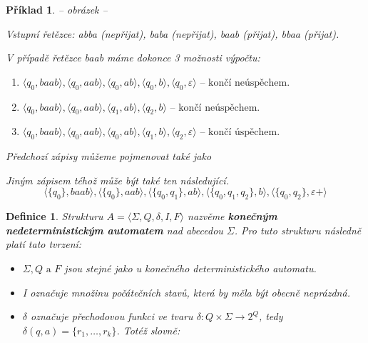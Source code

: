 \documentclass[10pt, a4paper, titlepage]{article}
\theoremstyle{note}
\newtheorem{definice}{\textbf{Definice}}
\newtheorem{priklad}{\textbf{Příklad}}
\begin{document}
\begin{priklad}
 -- obrázek --
 
 Vstupní řetězce: \textit{abba} (nepřijat), \textit{baba} (nepřijat), \textit{baab} (přijat), \textit{bbaa} (přijat).
 
 V případě řetězce \textit{baab} máme dokonce 3 možnosti výpočtu:
 \begin{enumerate}
 \item
 $ \langle q_{0}, baab \rangle, \langle q_{0}, aab \rangle, \langle q_{0}, ab \rangle, \langle q_{0}, b \rangle, \langle q_{0}, \varepsilon \rangle \text{ -- končí neúspěchem.}$
 \item
 $ \langle q_{0}, baab \rangle, \langle q_{0}, aab \rangle, \langle q_{1}, ab \rangle, \langle q_{2}, b \rangle \text{ -- končí neúspěchem.}$
 \item
 $ \langle q_{0}, baab \rangle, \langle q_{0}, aab \rangle, \langle q_{0}, ab \rangle, \langle q_{1}, b \rangle, \langle q_{2}, \varepsilon \rangle \text{ -- končí úspěchem.}$ 
 \end{enumerate}
 Předchozí zápisy můžeme pojmenovat také jako 
 
 Jiným zápisem téhož může být také ten následující.
 $$
 \langle \lbrace q_{0} \rbrace, baab \rangle, \langle \lbrace q_{0} \rbrace, aab \rangle, \langle \lbrace q_{0}, q_{1} \rbrace, ab \rangle,
 \langle \lbrace q_{0}, q_{1}, q_{2} \rbrace, b \rangle, \langle \lbrace q_{0}, q_{2} \rbrace, \varepsilon+ \rangle
 $$ 
\end{priklad}

\begin{definice}
Strukturu $ A = \langle \Sigma, Q, \delta, I, F \rangle $ nazvěme \textbf{konečným nedeterministickým automatem} nad abecedou $\Sigma$. Pro tuto strukturu následně platí tato tvrzení:
\begin{itemize}
\item
$ \Sigma, Q \text{ a } F$ jsou stejné jako u konečného deterministického automatu.
\item
\textit{I} označuje množinu počátečních stavů, která by měla být obecně neprázdná.
\item
$\delta$ označuje přechodovou funkci ve tvaru $ \delta : Q \times \Sigma \rightarrow 2^{Q}$, tedy $ \delta (q, a) = \lbrace r_{1}, \ldots, r_{k} \rbrace $. Totéž slovně: 
\end{itemize}
\end{definice}
\end{document}
